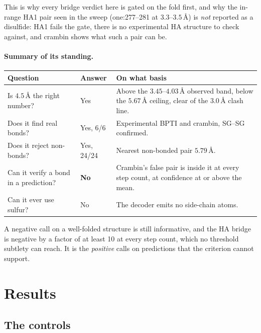\documentclass[11pt,a4paper]{article}
\newcommand{\ang}{\,\mbox{\AA}}
\begin{document}
This is why every bridge verdict here is gated on the fold first, and why the
in-range HA1 pair seen in the sweep (one:277--281 at $3.3$--$3.5\ang$) is
\emph{not} reported as a disulfide: HA1 fails the gate, there is no experimental
HA structure to check against, and crambin shows what such a pair can be.

\paragraph{Summary of its standing.}
\begin{center}
\small
\begin{tabular}{@{}llp{7.4cm}@{}}
\toprule
Question & Answer & On what basis \\
\midrule
Is $4.5\ang$ the right number? & Yes &
  Above the $3.45$--$4.03\ang$ observed band, below the $5.67\ang$ ceiling,
  clear of the $3.0\ang$ clash line. \\
Does it find real bonds? & Yes, 6/6 &
  Experimental BPTI and crambin, SG--SG confirmed. \\
Does it reject non-bonds? & Yes, 24/24 &
  Nearest non-bonded pair $5.79\ang$. \\
Can it verify a bond in a prediction? & \textbf{No} &
  Crambin's false pair is inside it at every step count, at confidence at or
  above the mean. \\
Can it ever use sulfur? & No &
  The decoder emits no side-chain atoms. \\
\bottomrule
\end{tabular}
\end{center}

\noindent A negative call on a well-folded structure is still informative, and
the HA bridge is negative by a factor of at least 10 at every step count, which
no threshold subtlety can reach. It is the \emph{positive} calls on predictions
that the criterion cannot support.

\section{Results}

\subsection{The controls}
\end{document}
